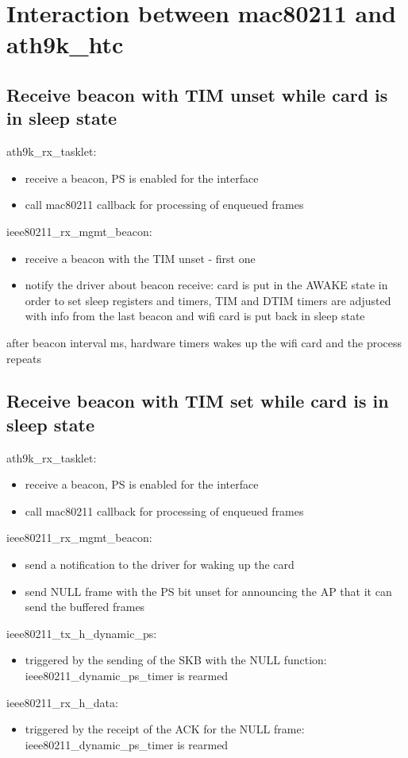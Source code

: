 \section{Interaction between mac80211 and ath9k_htc}
\label{sec:ath9khtcmac80211interction}

\subsection{Receive beacon with TIM unset while card is in sleep state}
\label{sub-sec:analysis-1}
ath9k_rx_tasklet: 
\begin{itemize}
\item receive a beacon, PS is enabled for the interface
\item call mac80211 callback for processing of enqueued frames
\end{itemize}
ieee80211_rx_mgmt_beacon:
\begin{itemize}
\item receive a beacon with the TIM unset - first one
\item notify the driver about beacon receive: card is put in the AWAKE state in order to set sleep registers and timers, TIM and DTIM timers are adjusted with info from the last beacon and wifi card is put back in sleep state
\end{itemize}
after beacon interval ms, hardware timers wakes up the wifi card and the process repeats

\subsection{Receive beacon with TIM set while card is in sleep state}
\label{sub-sec:analysis-2}
ath9k_rx_tasklet: 
\begin{itemize}
\item receive a beacon, PS is enabled for the interface
\item call mac80211 callback for processing of enqueued frames
\end{itemize}
ieee80211_rx_mgmt_beacon:
\begin{itemize}
\item send a notification to the driver for waking up the card
\item send NULL frame with the PS bit unset for announcing the AP that it can send the buffered frames
\end{itemize}
ieee80211_tx_h_dynamic_ps:
\begin{itemize}
\item triggered by the sending of the SKB with the NULL function: ieee80211_dynamic_ps_timer is rearmed
\end{itemize}
ieee80211_rx_h_data:
\begin{itemize}
\item triggered by the receipt of the ACK for the NULL frame: ieee80211_dynamic_ps_timer is rearmed
\end{itemize}

